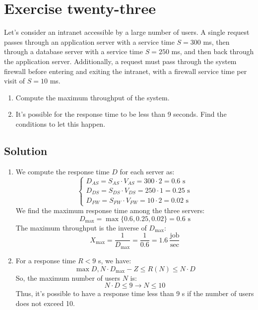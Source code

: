 \section{Exercise twenty-three}

Let's consider an intranet accessible by a large number of users. 
A single request passes through an application server with a service time $S=300$ ms, then through a database server with a service time $S=250$ ms, and then back through the application server. 
Additionally, a request must pass through the system firewall before entering and exiting the intranet, with a firewall service time per visit of $S=10$ ms.
\begin{enumerate}
    \item Compute the maximum throughput of the system.
    \item It's possible for the response time to be less than 9 seconds. 
        Find the conditions to let this happen. 
\end{enumerate}

\subsection*{Solution}
\begin{enumerate}
    \item We compute the response time $D$ for each server as:
        \[\begin{cases}
            D_{AS}=S_{AS}\cdot V_{AS}= 300 \cdot 2 = 0.6\text{ s} \\
            D_{DS}=S_{DS}\cdot V_{DS}= 250 \cdot 1 = 0.25\text{ s} \\
            D_{FW}=S_{FW}\cdot V_{FW}= 10 \cdot 2 = 0.02\text{ s}
        \end{cases}\]
        We find the maximum response time among the three servers:
        \[D_{\max}=\max\{0.6,0.25,0.02\}=0.6\text{ s}\]
        The maximum throughput is the inverse of $D_{\max}$:
        \[X_{\max}=\dfrac{1}{D_{\max}}=\dfrac{1}{0.6}=1.6\:\dfrac{\text{job}}{\text{sec}}\]
    \item For a response time $R < 9$ s, we have:
        \[\max{D,N\cdot D_{\max}-Z} \leq R(N) \leq N \cdot D\]
        So, the maximum number of users $N$ is:
        \[N \cdot D \leq 9\rightarrow N \leq 10\]
        Thus, it's possible to have a response time less than 9 s if the number of users does not exceed 10.
\end{enumerate}